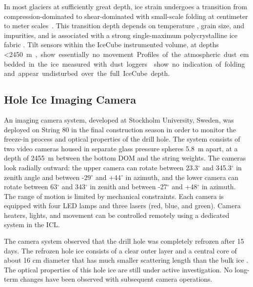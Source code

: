 In most glaciers at sufficiently great depth, ice strain undergoes a
transition from compression-dominated to shear-dominated with
small-scale folding at centimeter to meter scales~\cite{montagnat14,jansen16}.  This transition depth depends on
temperature \cite{price2002temperature}, grain size, and impurities, and is
associated with a strong single-maximum polycrystalline ice fabric
\cite{cuffey10}.  Tilt sensors within the IceCube instrumented volume, at
depths \SI{<2450}m, show essentially no movement.  Profiles of the
atmospheric dust embedded in the ice measured with dust loggers \cite{I3:dustlogger} show no
indication of folding and appear undisturbed over the full IceCube depth.

\subsection{Hole Ice Imaging Camera}

An imaging camera system, developed at Stockholm University, Sweden, was deployed on String 80 in the final
construction season in order to monitor the freeze-in process and optical
properties of the drill hole.  The system consists of two video cameras
housed in separate glass pressure spheres \SI{5.8}{m} apart, at a
depth of \SI{2455}{m} between the bottom DOM and the string
weights. The cameras look radially outward: the upper camera can
rotate between 23.3$^{\circ}$ and 345.3$^{\circ}$ in zenith angle and
between -29$^{\circ}$ and +44$^{\circ}$ in azimuth, and the lower
camera can rotate between 63$^{\circ}$ and 343$^{\circ}$ in zenith and
between -27$^{\circ}$ and +48$^{\circ}$ in azimuth. The range of
motion is limited by mechanical constraints. Each
camera is equipped with four LED lamps and three lasers (red, blue, and
green).  Camera heaters, lights, and movement can be controlled remotely
using a dedicated system in the ICL.  

The camera system observed that the drill hole was completely refrozen after
15 days.  The refrozen hole ice consists of a clear outer
layer and a central core of about 16 cm diameter that has much
smaller scattering length than the bulk ice \cite{rongen_vlvnt15}.  The
optical properties of this hole ice are still under active investigation.
No long-term changes have been observed with subsequent camera operations.
